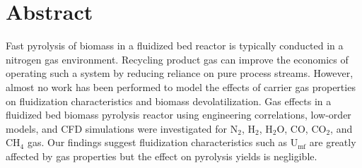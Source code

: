 
\section*{Abstract}

Fast pyrolysis of biomass in a fluidized bed reactor is typically conducted in a nitrogen gas environment. Recycling product gas can improve the economics of operating such a system by reducing reliance on pure process streams. However, almost no work has been performed to model the effects of carrier gas properties on fluidization characteristics and biomass devolatilization. Gas effects in a fluidized bed biomass pyrolysis reactor using engineering correlations, low-order models, and CFD simulations were investigated for N$_2$, H$_2$, H$_2$O, CO, CO$_2$, and CH$_4$ gas. Our findings suggest fluidization characteristics such as U$_\textrm{mf}$ are greatly affected by gas properties but the effect on pyrolysis yields is negligible.